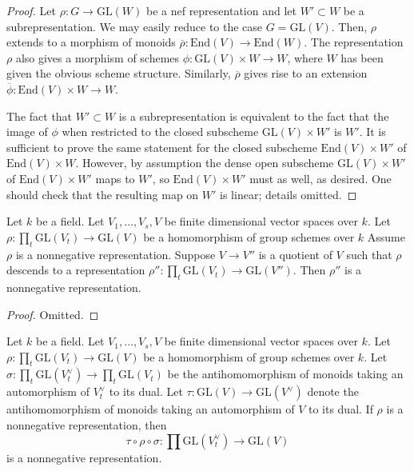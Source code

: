 \begin{proof}
Let $\rho:G\to \mathrm{GL}(W)$ be a nef representation and let
$W'\subset W$ be a subrepresentation.
We may easily reduce to the case $G=\mathrm{GL}(V)$.
Then, $\rho$ extends to a morphism of monoids
$\overline{\rho}:\mathrm{End}(V)\to \mathrm{End}(W)$.
The representation $\rho$ also gives a morphism of schemes
$\phi:\mathrm{GL}(V)\times W\to W$, where $W$ has been given the obvious scheme
structure.
Similarly, $\overline{\rho}$ gives rise to an extension
$\overline{\phi}:\mathrm{End}(V)\times W\to W$.

The fact that $W'\subset W$ is a subrepresentation is equivalent to the fact
that the image of $\phi$ when restricted to the closed subscheme
$\mathrm{GL}(V)\times W'$ is $W'$.
It is sufficient to prove the same statement for the closed subscheme
$\mathrm{End}(V)\times W'$ of $\mathrm{End}(V)\times W$.
However, by assumption the dense open subscheme $\mathrm{GL}(V)\times W'$ of
$\mathrm{End}(V)\times W'$ maps to $W'$, so $\mathrm{End}(V)\times W'$ must as
well, as desired. One should check that the resulting map on $W'$ is linear;
details omitted.
\end{proof}

\begin{lemma}
\label{lemma-quotient-nonneg-rep}
Let $k$ be a field.
Let $V_1,\ldots,V_s,V$ be finite dimensional vector spaces over $k$.
Let $\rho : \prod_t \mathrm{GL}(V_t) \to \mathrm{GL}(V)$ be a homomorphism of
group schemes over $k$
Assume $\rho$ is a nonnegative representation.
Suppose $V \to V''$ is a quotient of $V$ such that $\rho$ descends to a
representation $\rho'' : \prod_t \mathrm{GL}(V_t) \to \mathrm{GL}(V'')$.
Then $\rho''$ is a nonnegative representation.
\end{lemma}

\begin{proof}
Omitted.
\end{proof}

\begin{lemma}
\label{lemma-star-rho-star-nonneg-rep}
Let $k$ be a field.
Let $V_1,\ldots,V_s,V$ be finite dimensional vector spaces over $k$.
Let $\rho : \prod_t \mathrm{GL}(V_t) \to \mathrm{GL}(V)$ be a homomorphism
of group schemes over $k$.
Let $\sigma : \prod_t \mathrm{GL}(V_t^\vee) \to \prod_t \mathrm{GL}(V_t)$ be
the antihomomorphism of monoids taking an automorphism of $V_t^\vee$ to its dual.
Let $\tau : \mathrm{GL}(V) \to \mathrm{GL}(V^\vee)$ denote the antihomomorphism
of monoids taking an automorphism of $V$ to its dual.
If $\rho$ is a nonnegative representation, then
$$
  \tau \circ \rho \circ \sigma : \prod \mathrm{GL}(V_t^\vee) \to \mathrm{GL}(V)
$$
is a nonnegative representation.
\end{lemma}

